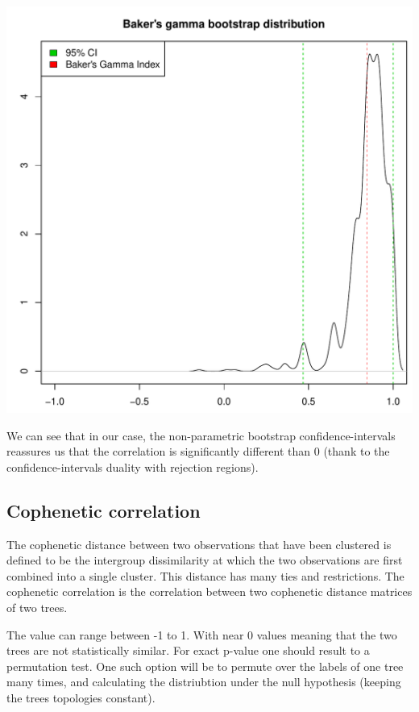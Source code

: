 \documentclass[shortnames,nojss,article]{jss}\usepackage[]{graphicx}\usepackage[]{color}
\makeatletter
\def\maxwidth{ %
  \ifdim\Gin@nat@width>\linewidth
    \linewidth
  \else
    \Gin@nat@width
  \fi
}
\newenvironment{knitrout}{}{} %
\makeatother
\begin{document}
\begin{knitrout}
{\centering \includegraphics[width=\maxwidth]{figure/cor_bakers_gamma_simulation_CI_43} 

}



\end{knitrout}


We can see that in our case, the non-parametric bootstrap confidence-intervals reassures us that the correlation is significantly different than 0 (thank to the confidence-intervals duality with rejection regions). 




\subsection{Cophenetic correlation}

The cophenetic distance between two observations that have been clustered is defined to be the intergroup dissimilarity at which the two observations are first combined into a single cluster. This distance has many ties and restrictions. The cophenetic correlation \citep{sokal1962comparison} is the correlation between two cophenetic distance matrices of two trees.

The value can range between -1 to 1. With near 0 values meaning that the two trees are not statistically similar. For exact p-value one should result to a permutation test. One such option will be to permute over the labels of one tree many times, and calculating the distriubtion under the null hypothesis (keeping the trees topologies constant).
\end{document}
